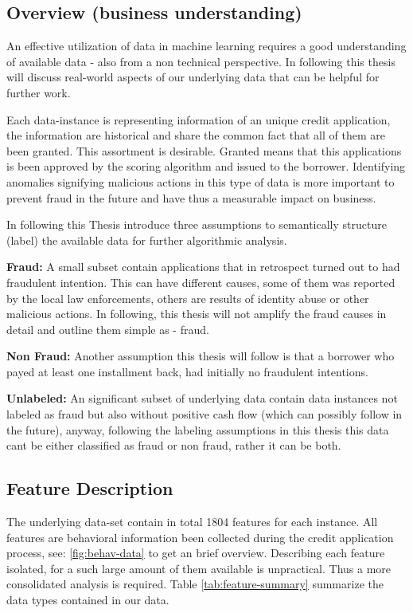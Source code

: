 \subsection{Overview (business understanding)}\label{Ch:2:Overview}
An effective utilization of data in machine learning requires a good understanding of available data - also from a non technical perspective. In following this thesis will discuss real-world aspects of our underlying data that can be helpful for further work.

Each data-instance is representing information of an unique credit application, the information are historical and share the common fact that all of them are been granted. This assortment is desirable. Granted means that this applications is been approved by the scoring algorithm and issued to the borrower. Identifying anomalies signifying malicious actions in this type of data is more important to prevent fraud in the future and have thus a measurable impact on business.

In following this Thesis introduce three assumptions to semantically structure (label) the available data for further algorithmic analysis.

\textbf{Fraud:} 
A small subset contain applications that in retrospect turned out to had fraudulent intention. This can have different causes, some of them was reported by the local law enforcements, others are results of identity abuse or other malicious actions. In following, this thesis will not amplify the fraud causes in detail and outline them simple as -  fraud.

\textbf{Non Fraud:} 
Another assumption this thesis will follow is that a borrower who payed at least one installment back, had initially no fraudulent intentions. 

\textbf{Unlabeled:}
An significant subset of underlying data contain data instances not labeled as fraud but also without positive cash flow (which can possibly follow in the future), anyway, following the labeling assumptions in this thesis this data cant be either classified as fraud or non fraud, rather it can be both.

\subsection{Feature Description}\label{Ch:2:FeatureDesc}
The underlying data-set contain in total 1804 features for each instance. All features are behavioral information  been collected during the credit application process, see: \ref{fig:behav-data} to get an brief overview. Describing each feature isolated, for a such large amount of them available is unpractical. Thus a more consolidated analysis is required. Table \ref{tab:feature-summary} summarize the data types contained in our data.

